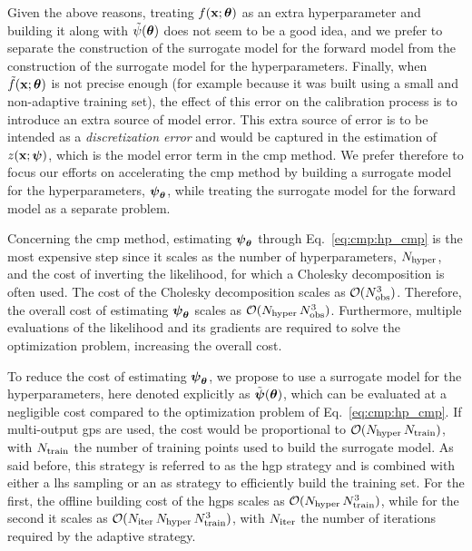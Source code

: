 \smallskip
Given the above reasons, treating $f(\mathbf{x};\boldsymbol{\theta})$ as an extra hyperparameter and building it along with $\tilde{\psi}(\boldsymbol{\theta})$ does not seem to be a good idea, and we prefer to separate the construction of the surrogate model for the forward model from the construction of the surrogate model for the hyperparameters. Finally, when $\tilde{f}(\mathbf{x}; \boldsymbol{\theta})$ is not precise enough (for example because it was built using a small and non-adaptive training set), the effect of this error on the calibration process is to introduce an extra source of model error. This extra source of error is to be intended as a \textit{discretization error} and would be captured in the estimation of $z(\mathbf{x}; \boldsymbol{\psi})$, which is the model error term in the \gls{cmp} method. We prefer therefore to focus our efforts on accelerating the \gls{cmp} method by building a surrogate model for the hyperparameters, $\boldsymbol{\psi}_{\boldsymbol{\theta}}$, while treating the surrogate model for the forward model as a separate problem.

\smallskip
Concerning the \gls{cmp} method, estimating $\boldsymbol{\psi}_{\boldsymbol{\theta}}$ through Eq.~\eqref{eq:cmp:hp_cmp} is the most expensive step since it scales as the number of hyperparameters, $N_{\mathrm{hyper}}$, and the cost of inverting the likelihood, for which a Cholesky decomposition is often used. The cost of the Cholesky decomposition scales as $\mathcal{O}(N_{\mathrm{obs}}^3)$. Therefore, the overall cost of estimating $\boldsymbol{\psi}_{\boldsymbol{\theta}}$ scales as $\mathcal{O}(N_{\mathrm{hyper}} \, N_{\mathrm{obs}}^3)$. Furthermore, multiple evaluations of the likelihood and its gradients are required to solve the optimization problem, increasing the overall cost.

\smallskip
To reduce the cost of estimating $\boldsymbol{\psi}_{\boldsymbol{\theta}}$, we propose to use a surrogate model for the hyperparameters, here denoted explicitly as $\tilde{\boldsymbol{\psi}}(\boldsymbol{\theta})$, which can be evaluated at a negligible cost compared to the optimization problem of Eq.~\eqref{eq:cmp:hp_cmp}. If multi-output \glspl{gp} are used, the cost would be proportional to $\mathcal{O}(N_{\mathrm{hyper}} \, N_{\mathrm{train}})$, with $N_{\mathrm{train}}$ the number of training points used to build the surrogate model. As said before, this strategy is referred to as the \gls{hgp} strategy and is combined with either a \gls{lhs} sampling or an \gls{as} strategy to efficiently build the training set. For the first, the offline building cost of the \glspl{hgp} scales as $\mathcal{O}(N_{\mathrm{hyper}} \, N_{\mathrm{train}}^3)$, while for the second it scales as $\mathcal{O}({N_{\mathrm{iter}}} \, N_{\mathrm{hyper}} \, N_{\mathrm{train}}^3)$, with ${N_{\mathrm{iter}}}$ the number of iterations required by the adaptive strategy. 

